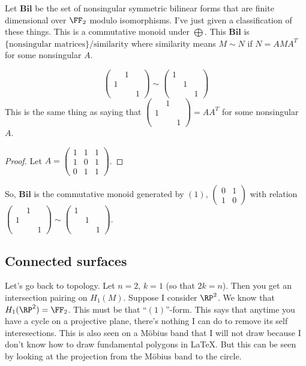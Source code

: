 Let $\mathbf{Bil}$ be the set of nonsingular symmetric bilinear forms that are finite dimensional over $\FF_2$ modulo isomorphisms. I've just given a classification of these things. This is a commutative monoid under $\bigoplus$. This $\mathbf{Bil}$ is $\{\text{nonsingular matrices}\}/\text{similarity}$ where similarity means $M\sim N$ if $N=AMA^T$ for some nonsingular $A$.
\begin{claim}
\begin{equation*}
\begin{pmatrix}
 & 1 & \\
1 & & \\
 & & 1
\end{pmatrix}
\sim
\begin{pmatrix}
1 & & \\
& 1 & \\
& & 1
\end{pmatrix}
\end{equation*}
This is the same thing as saying that $\begin{pmatrix}
 & 1 & \\
1 & & \\
 & & 1
\end{pmatrix}=AA^T$ for some nonsingular $A$.
\end{claim}
\begin{proof}
Let $A=\begin{pmatrix}1 & 1 & 1 \\ 1 & 0 & 1 \\ 0 & 1 & 1 \end{pmatrix}$.
\end{proof}
So, $\mathbf{Bil}$ is the commutative monoid generated by $(1)$, $\begin{pmatrix}0 & 1 \\ 1 & 0\end{pmatrix}$ with relation $\begin{pmatrix}
 & 1 & \\
1 & & \\
 & & 1
\end{pmatrix}
\sim
\begin{pmatrix}
1 & & \\
& 1 & \\
& & 1
\end{pmatrix}$.
\subsection{Connected surfaces}
Let's go back to topology. Let $n=2$, $k=1$ (so that $2k=n$). Then you get an intersection pairing on $ H_1(M)$. Suppose I consider $\RP^2$. We know that $ H_1(\RP^2)=\FF_2$. This must be that ``$(1)$''-form. This says that anytime you have a cycle on a projective plane, there's nothing I can do to remove its self interesections. This is also seen on a M\"obius band that I will not draw because I don't know how to draw fundamental polygons in LaTeX. But this can be seen by looking at the projection from the M\"obius band to the circle.

